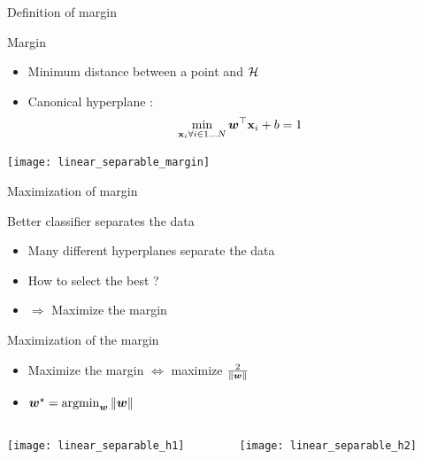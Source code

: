 \documentclass[11pt, pdf, compress, handout]{beamer}
\begin{document}
\begin{frame}[label={sec:org0f58461}]{Definition of margin}
  \begin{block}{Margin}
    \begin{itemize}
    \item Minimum distance between a point and ${\mathcal{H}}$
    \item Canonical hyperplane :
      $$
      \min_{{\mathbf{x}}_i \forall i \in 1\dots N} {\boldsymbol{w}}^\top {{\mathbf{x}}_i} + b = 1
      $$
    \end{itemize}
    \begin{center}
      \texttt{[image: linear\_separable\_margin]}
    \end{center}
  \end{block}
\end{frame}
\begin{frame}{Maximization of margin}
  \begin{block}{Better classifier separates the data}
    \begin{itemize}
    \item Many different hyperplanes separate the data
    \item How to select the best ?
    \item $\Rightarrow$ Maximize the margin
    \end{itemize}
  \end{block}
  \begin{block}{Maximization of the margin}
    \begin{itemize}
    \item Maximize the margin $\Leftrightarrow$ maximize $ \frac{2}{\| {\boldsymbol{w}}
        \|}$
    \item ${\boldsymbol{w}}^\star = \operatorname*{argmin}_{\boldsymbol{w}} \| {\boldsymbol{w}} \|$ 
    \end{itemize}
  \end{block}
  \framebreak
  \begin{columns}
    \begin{column}{.47\textwidth}
      \texttt{[image: linear\_separable\_h1]}
    \end{column}
    \begin{column}{.47\textwidth}
      \texttt{[image: linear\_separable\_h2]}
    \end{column}
  \end{columns}
  
\end{frame}
\end{document}
